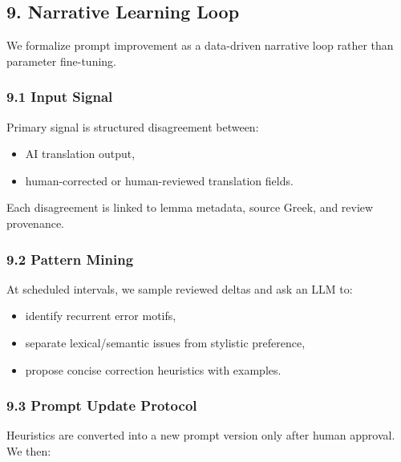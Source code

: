 \documentclass[
]{article}
\providecommand{\tightlist}{%
  \setlength{\itemsep}{0pt}\setlength{\parskip}{0pt}}
\begin{document}
\hypertarget{9-narrative-learning-loop}{%
\subsection{9. Narrative Learning
Loop}\label{9-narrative-learning-loop}}

We formalize prompt improvement as a data-driven narrative loop rather
than parameter fine-tuning.

\hypertarget{91-input-signal}{%
\subsubsection{9.1 Input Signal}\label{91-input-signal}}

Primary signal is structured disagreement between:

\begin{itemize}
\tightlist
\item
  AI translation output,
\item
  human-corrected or human-reviewed translation fields.
\end{itemize}

Each disagreement is linked to lemma metadata, source Greek, and review
provenance.

\hypertarget{92-pattern-mining}{%
\subsubsection{9.2 Pattern Mining}\label{92-pattern-mining}}

At scheduled intervals, we sample reviewed deltas and ask an LLM to:

\begin{itemize}
\tightlist
\item
  identify recurrent error motifs,
\item
  separate lexical/semantic issues from stylistic preference,
\item
  propose concise correction heuristics with examples.
\end{itemize}

\hypertarget{93-prompt-update-protocol}{%
\subsubsection{9.3 Prompt Update
Protocol}\label{93-prompt-update-protocol}}

Heuristics are converted into a new prompt version only after human
approval. We then:
\end{document}
